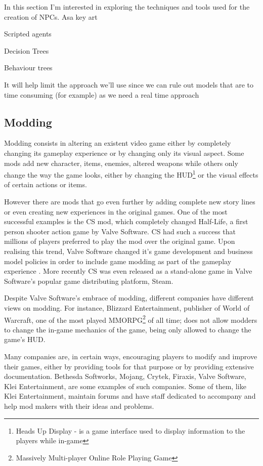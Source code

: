 In this section I'm interested in exploring the techniques and tools used for the creation of \ac{NPC}s.
Asa key art 


Scripted agents

Decision Trees

Behaviour trees

It will help limit the approach we'll use since we can rule out models that are to time consuming (for example) as we need a real time approach

\subsection{Modding}
Modding consists in altering an existent video game either by completely changing its gameplay experience or by changing only its visual aspect.
Some mods add new character, items, enemies, altered weapons while others only change the way the game looks, either by changing the \ac{HUD}\footnote{Heads Up Display - is a game interface used to display information to the players while in-game} or the visual effects of certain actions or items.

However there are mods that go even further by adding complete new story lines or even creating new experiences in the original games.
One of the most successful examples is the \ac{CS} mod, which completely changed Half-Life, a first person shooter action game by Valve Software.
\ac{CS} had such a success that millions of players preferred to play the mod over the original game.
Upon realising this trend, Valve Software changed it's game development and business model policies in order to include game modding as part of the gameplay experience \cite{scacchi:mods}.
More recently \ac{CS} was even released as a stand-alone game in Valve Software's popular game distributing platform, Steam.

Despite Valve Software's embrace of modding, different companies have different views on modding.
For instance, Blizzard Entertainment, publisher of World of Warcraft, one of the most played MMORPG\footnote{Massively Multi-player Online Role Playing Game} of all time; does not allow modders to change the in-game mechanics of the game, being only allowed to change the game's \ac{HUD}.

Many companies are, in certain ways, encouraging players to modify and improve their games, either by providing tools for that purpose or by providing extensive documentation.
Bethesda Softworks, Mojang, Crytek, Firaxis, Valve Software, Klei Entertainment, are some examples of such companies.
Some of them, like Klei Entertainment, maintain forums and have staff dedicated to accompany and help mod makers with their ideas and problems.

